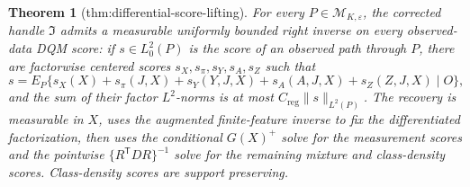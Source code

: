 \documentclass{article}
\newtheorem{theorem}{Theorem}
\begin{document}
\begin{theorem}[thm:differential-score-lifting]\label{thm:differential-score-lifting}
For every \(P\in\mathcal M_{K,\varepsilon}\), the corrected handle \(\mathfrak I\) admits a measurable uniformly bounded right inverse on every observed-data DQM score: if \(s\in L^2_0(P)\) is the score of an observed path through \(P\), there are factorwise centered scores \(s_X,s_\pi,s_Y,s_A,s_Z\) such that
\[
s=E_P\{s_X(X)+s_\pi(J,X)+s_Y(Y,J,X)+s_A(A,J,X)+s_Z(Z,J,X)\mid O\},
\]
and the sum of their factor \(L^2\)-norms is at most \(C_{\mathrm{reg}}\|s\|_{L^2(P)}\).  The recovery is measurable in \(X\), uses the augmented finite-feature inverse to fix the differentiated factorization, then uses the conditional \(G(X)^+\) solve for the measurement scores and the pointwise \(\{R^{\mathsf T}DR\}^{-1}\) solve for the remaining mixture and class-density scores.  Class-density scores are support preserving.
\end{theorem}
\end{document}
